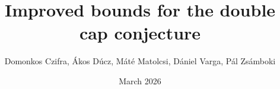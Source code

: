\documentclass[11pt]{amsart}
\numberwithin{equation}{section}
\begin{document}
\title{Improved bounds for the double cap conjecture}

\author{Domonkos Czifra, \'Akos D\'ucz, M\'at\'e Matolcsi, D\'aniel Varga, P\'al Zs\'amboki}


\address{Czifra Domonkos, HUN-REN Alfr\'ed R\'enyi Institute of Mathematics, Re\'altanoda utca 13-15, 1053 Budapest, Hungary}

\address{\'Akos D\'ucz, HUN-REN Alfr\'ed R\'enyi Institute of Mathematics, Re\'altanoda utca 13-15, 1053 Budapest, Hungary}

\address{M\'at\'e Matolcsi, HUN-REN Alfr\'ed R\'enyi Institute of Mathematics, Re\'altanoda utca 13-15, 1053 Budapest, Hungary
and 
Department of Analysis and Operations Research,
Institute of Mathematics,
Budapest University of Technology and Economics,
M\H uegyetem rkp. 3., H-1111 Budapest, Hungary
}



\address{D\'aniel Varga, HUN-REN Alfr\'ed R\'enyi Institute of Mathematics, Re\'altanoda utca 13-15, 1053 Budapest, Hungary}

\address{P\'al Zs\'amboki, HUN-REN Alfr\'ed R\'enyi Institute of Mathematics, Re\'altanoda utca 13-15, 1053 Budapest, Hungary}

\date{March 2026}
\end{document}
